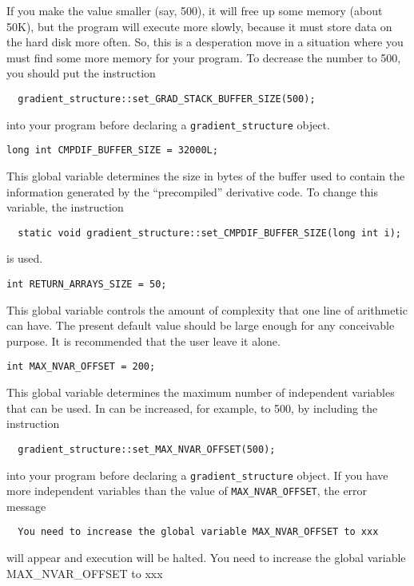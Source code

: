 \documentclass{admbmanual}
\begin{document}
If you make the value smaller (say, 500), it will free up some memory (about
50K), but the program will execute more slowly, because it must store data on
the hard disk more often. So, this is a desperation move in a situation where
you must find some more memory for your program. To decrease the number to 500,
you should put the instruction
\begin{lstlisting}
  gradient_structure::set_GRAD_STACK_BUFFER_SIZE(500);
\end{lstlisting}
into your program before declaring a \texttt{gradient\_structure} object.

\bigskip
{}
\begin{lstlisting}
long int CMPDIF_BUFFER_SIZE = 32000L;
\end{lstlisting}
This global variable determines the size in bytes of the buffer used to contain
the information generated by the ``precompiled'' derivative code. To change this
variable, the instruction
\begin{lstlisting}
  static void gradient_structure::set_CMPDIF_BUFFER_SIZE(long int i);
\end{lstlisting}
is used.

\bigskip
{}
\begin{lstlisting}
int RETURN_ARRAYS_SIZE = 50;
\end{lstlisting}
This global variable controls the amount of complexity that one line of
arithmetic can have. The present default value should be large enough for any
conceivable purpose. It is recommended that the user leave it alone.

\bigskip
{}
\begin{lstlisting}
int MAX_NVAR_OFFSET = 200;
\end{lstlisting}
This global variable determines the maximum number of independent variables that
can be used. In can be increased, for example, to 500, by including the
instruction
\begin{lstlisting}
  gradient_structure::set_MAX_NVAR_OFFSET(500);
\end{lstlisting}
into your program before declaring a \texttt{gradient\_structure} object. If you
have more independent variables than the value of \texttt{MAX\_NVAR\_OFFSET},
the error message
\begin{lstlisting}
  You need to increase the global variable MAX_NVAR_OFFSET to xxx
\end{lstlisting}
will appear and execution will be halted.
 {%
{You need to increase the global variable  MAX\_NVAR\_OFFSET to xxx}}
\end{document}
